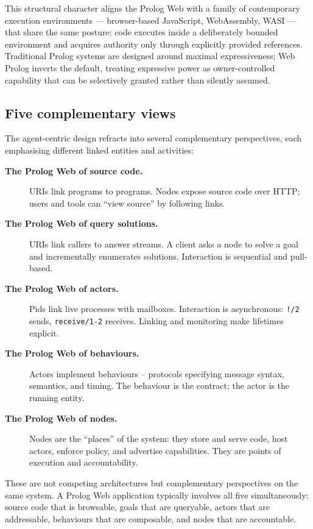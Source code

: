 This structural character aligns the Prolog Web with a family of
contemporary execution environments --- browser-based JavaScript,
WebAssembly, WASI --- that share the same posture: code executes inside a
deliberately bounded environment and acquires authority only through
explicitly provided references. Traditional Prolog systems are designed
around maximal expressiveness; Web Prolog inverts the default,
treating expressive power as owner-controlled capability that can be
selectively granted rather than silently assumed.


\subsection{Five complementary views}\label{sec:paradigm-five-views}

The agent-centric design refracts into several complementary
perspectives, each emphasising different linked entities and activities:

\begin{description}
\item[\textbf{The Prolog Web of source code.}] URIs link programs to
programs. Nodes expose source code over HTTP; users and tools can ``view
source'' by following links.

\item[\textbf{The Prolog Web of query solutions.}] URIs link callers to
answer streams. A client asks a node to solve a goal and incrementally
enumerates solutions. Interaction is sequential and pull-based.

\item[\textbf{The Prolog Web of actors.}] Pids link live processes with
mailboxes. Interaction is asynchronous: \texttt{!/2} sends,
\texttt{receive/1-2} receives. Linking and monitoring make lifetimes
explicit.

\item[\textbf{The Prolog Web of behaviours.}] Actors implement
behaviours -- protocols specifying message syntax, semantics, and
timing. The behaviour is the contract; the actor is the running entity.

\item[\textbf{The Prolog Web of nodes.}] Nodes are the ``places'' of the
system: they store and serve code, host actors, enforce policy, and
advertise capabilities. They are points of execution and accountability.
\end{description}

\noindent These are not competing architectures but complementary
perspectives on the same system. A Prolog Web application typically
involves all five simultaneously: source code that is browsable, goals
that are queryable, actors that are addressable, behaviours that are
composable, and nodes that are accountable.


